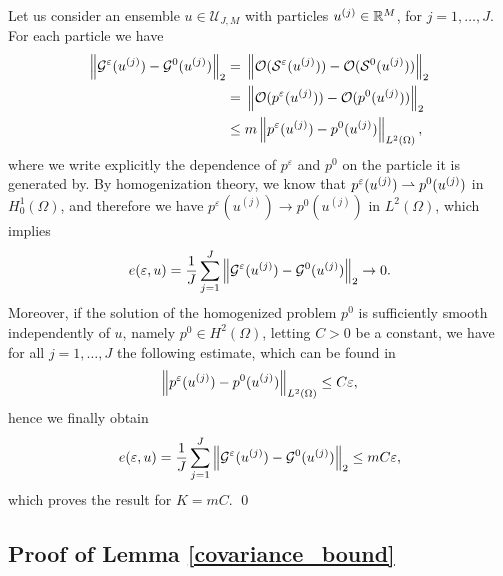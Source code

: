 Let us consider an ensemble $u \in \mathcal U_{J,M}$ with particles $u^{(j)} \in \mathbb{R}^M$, for $j = 1, \ldots, J$. For each particle we have
\begin{align}
\left\|\mathcal{G}^{\varepsilon}(u^{(j)}) - \mathcal{G}^0(u^{(j)})\right\|_2 = & \; \left\|\mathcal{O}(\mathcal{S}^{\varepsilon}(u^{(j)})) - \mathcal{O}(\mathcal{S}^0(u^{(j)}))\right\|_2 \\
= & \; \left\|\mathcal{O}(p^{\varepsilon}(u^{(j)})) - \mathcal{O}(p^0(u^{(j)}))\right\|_2 \\
\le & \; m \left\|p^{\varepsilon}(u^{(j)}) - p^0(u^{(j)})\right\|_{L^2(\Omega)},
\end{align}
where we write explicitly the dependence of $p^{\varepsilon}$ and $p^0$ on the particle it is generated by.
By homogenization theory, we know that $p^{\varepsilon}(u^{(j)}) \rightharpoonup p^0(u^{(j)})$ in $H^1_0(\Omega)$, and therefore we have $p^{\varepsilon}(u^{(j)}) \to p^0(u^{(j)})$ in $L^2(\Omega)$, which implies
\[ e(\varepsilon, u) = \frac{1}{J} \sum_{j=1}^J \left\|\mathcal{G}^{\varepsilon}(u^{(j)}) - \mathcal{G}^0(u^{(j)})\right\|_2 \to 0. \]
Moreover, if the solution of the homogenized problem $p^0$ is sufficiently smooth independently of $u$, namely $p^0 \in H^2(\Omega)$, letting $C > 0$ be a constant, we have for all $j = 1, \dots, J$ the following estimate, which can be found in \cite{Gri05}
\[ \left\|p^{\varepsilon}(u^{(j)}) - p^0(u^{(j)})\right\|_{L^2(\Omega)} \le C \varepsilon, \]
hence we finally obtain
\[ e(\varepsilon, u) = \frac{1}{J} \sum_{j=1}^J \left\|\mathcal{G}^{\varepsilon}(u^{(j)}) - \mathcal{G}^0(u^{(j)})\right\|_2 \le m C \varepsilon, \]
which proves the result for $K = m C$.
\qed

\subsection*{Proof of Lemma \ref{covariance_bound}}

